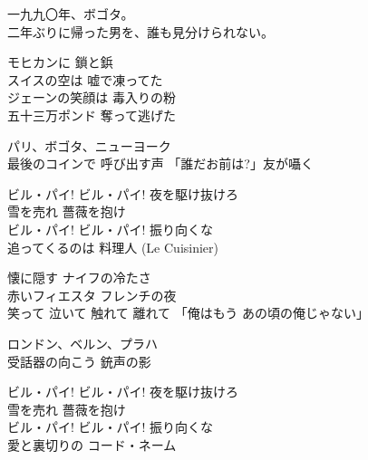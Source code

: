 \begin{lyrics}
\begin{japanese}
一九九〇年、ボゴタ。\\
二年ぶりに帰った男を、誰も見分けられない。
\end{japanese}


\begin{japanese}
モヒカンに 鎖と鋲\\
スイスの空は 嘘で凍ってた\\
ジェーンの笑顔は 毒入りの粉\\
五十三万ポンド 奪って逃げた
\end{japanese}

\begin{japanese}
パリ、ボゴタ、ニューヨーク\\
最後のコインで 呼び出す声
「誰だお前は?」友が囁く
\end{japanese}

\begin{japanese}
ビル・パイ! ビル・パイ! 夜を駆け抜けろ\\
雪を売れ 薔薇を抱け\\
ビル・パイ! ビル・パイ! 振り向くな\\
追ってくるのは 料理人 (Le Cuisinier)
\end{japanese}

\begin{japanese}
懐に隠す ナイフの冷たさ\\
赤いフィエスタ フレンチの夜\\
笑って 泣いて 触れて 離れて
「俺はもう あの頃の俺じゃない」
\end{japanese}

\begin{japanese}
ロンドン、ベルン、プラハ\\
受話器の向こう 銃声の影
\end{japanese}

\begin{japanese}
ビル・パイ! ビル・パイ! 夜を駆け抜けろ\\
雪を売れ 薔薇を抱け\\
ビル・パイ! ビル・パイ! 振り向くな\\
愛と裏切りの コード・ネーム
\end{japanese}


\end{lyrics}
